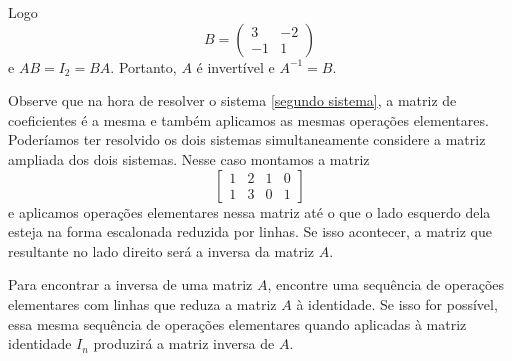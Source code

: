 Logo
\[
    B = \begin{pmatrix}
        3 & -2\\
        -1 & 1
    \end{pmatrix}
\]
e $AB = I_2 = BA$. Portanto, $A$ é invertível e $A^{-1} = B$.

Observe que na hora de resolver o sistema \eqref{segundo sistema}, a matriz de coeficientes é a mesma e também  aplicamos as mesmas operações elementares. Poderíamos ter resolvido os dois sistemas simultaneamente considere a matriz ampliada dos dois sistemas. Nesse caso montamos a matriz
\[
    \left[\begin{array}{cc|cc}
        1 & 2 & 1 & 0\\
        1 & 3 & 0 & 1
    \end{array}\right]
\]
e aplicamos operações elementares nessa matriz até o que o lado esquerdo dela esteja na forma escalonada reduzida por linhas. Se isso acontecer, a matriz que resultante no lado direito será a inversa da matriz $A$.

\begin{observacao}
    Para encontrar a inversa de uma matriz $A$, encontre uma sequência de operações elementares com linhas que reduza a matriz $A$ à identidade. Se isso for possível, essa mesma sequência de operações elementares quando aplicadas à matriz identidade $I_n$ produzirá a matriz inversa de $A$.
\end{observacao}

